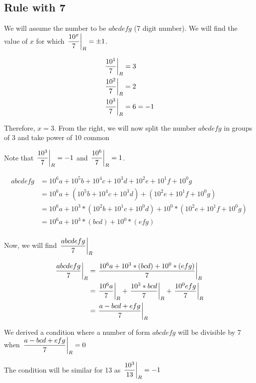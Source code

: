 \subsection{Rule with 7}

We will assume the number to be $abcdefg$ (7 digit number). We will find the value of $x$ for which $\displaystyle{ \left. \frac{10^x}{7} \right |_{R} } = \pm1$. 

\begin{align*}
    \displaystyle{ \left. \frac{10^1}{7} \right |_{R} } &= 3 \\
    \displaystyle{ \left. \frac{10^2}{7} \right |_{R} } &= 2 \\
    \displaystyle{ \left. \frac{10^3}{7} \right |_{R} } &= 6 = -1
\end{align*}

Therefore, $x=3$. From the right, we will now split the number $abcdefg$ in groups of 3 and take power of 10 common

\begin{NOTE}
    Note that $\displaystyle{ \left. \frac{10^3}{7} \right |_{R} } = -1$ and $\displaystyle{ \left. \frac{10^6}{7} \right |_{R} } = 1$.
\end{NOTE}

\begin{align*}
    abcdefg &= 10^6a + 10^5b + 10^4c + 10^3d + 10^2e + 10^1f + 10^0g \\
    &= 10^6a + (10^5b + 10^4c + 10^3d) + (10^2e + 10^1f + 10^0g) \tag{Grouping from right} \\
    &= 10^6a + 10^3 * (10^2b + 10^1c + 10^0d) + 10^0 * (10^2e + 10^1f + 10^0g) \tag{Take powers of 10 common in groups} \\
    &= 10^6a + 10^3 * (bcd) + 10^0 * (efg) \tag{$lmn$ is $10^2l + 10^1m + n$} \\
\end{align*}

Now, we will find $\displaystyle{ \left. \frac{abcdefg}{7} \right |_{R} }$

\begin{align*}
    \displaystyle{ \left. \frac{abcdefg}{7} \right |_{R} } &= \displaystyle{ \left. \frac{10^6a + 10^3 * (bcd) + 10^0 * (efg)}{7} \right |_{R} } \\
    &= \displaystyle{ \left. \frac{10^6a}{7} \right |_{R} } + \displaystyle{ \left. \frac{10^3 * bcd}{7} \right |_{R} } + \displaystyle{ \left. \frac{10^0 efg}{7} \right |_{R} } \\
    &= \displaystyle{ \left. \frac{a - bcd + efg}{7} \right |_{R} }
\end{align*}

We derived a condition where a number of form $abcdefg$ will be divisible by 7 when $\displaystyle{ \left. \frac{a - bcd + efg}{7} \right |_{R} } = 0$

\begin{EXTRA-LEARNING}
    The condition will be similar for 13 as $\displaystyle{ \left. \frac{10^3}{13} \right |_{R} } = -1$
\end{EXTRA-LEARNING}

